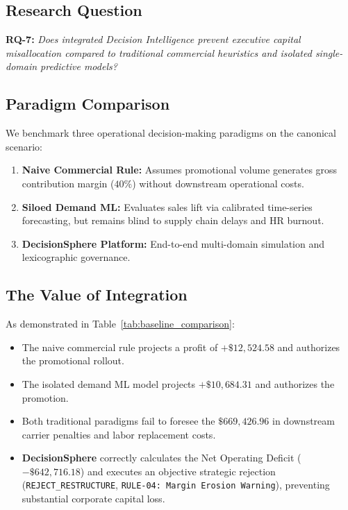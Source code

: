 \documentclass[10pt,conference]{IEEEtran}
\begin{document}
\subsection{Research Question}
\textbf{RQ-7:} \textit{Does integrated Decision Intelligence prevent executive capital misallocation compared to traditional commercial heuristics and isolated single-domain predictive models?}

\subsection{Paradigm Comparison}
We benchmark three operational decision-making paradigms on the canonical scenario:
\begin{enumerate}
    \item \textbf{Naive Commercial Rule:} Assumes promotional volume generates gross contribution margin ($40\%$) without downstream operational costs.
    \item \textbf{Siloed Demand ML:} Evaluates sales lift via calibrated time-series forecasting, but remains blind to supply chain delays and HR burnout.
    \item \textbf{DecisionSphere Platform:} End-to-end multi-domain simulation and lexicographic governance.
\end{enumerate}



\subsection{The Value of Integration}
As demonstrated in Table~\ref{tab:baseline_comparison}:
\begin{itemize}
    \item The naive commercial rule projects a profit of $+\$12,524.58$ and authorizes the promotional rollout.
    \item The isolated demand ML model projects $+\$10,684.31$ and authorizes the promotion.
    \item Both traditional paradigms fail to foresee the $\$669,426.96$ in downstream carrier penalties and labor replacement costs.
    \item \textbf{DecisionSphere} correctly calculates the Net Operating Deficit ($-\$642,716.18$) and executes an objective strategic rejection (\texttt{REJECT\_RESTRUCTURE}, \texttt{RULE-04: Margin Erosion Warning}), preventing substantial corporate capital loss.
\end{itemize}
\end{document}

